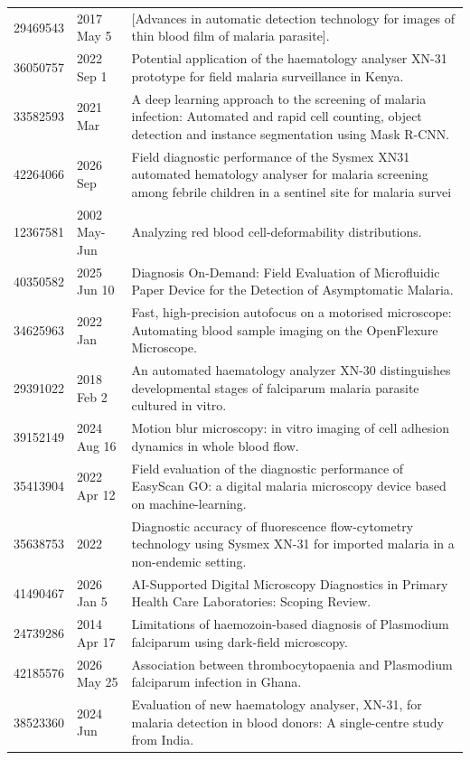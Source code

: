 \begin{longtable}{llp{9.5cm}}
29469543 & 2017 May 5 & [Advances in automatic detection technology for images of thin blood film of malaria parasite]. \\
36050757 & 2022 Sep 1 & Potential application of the haematology analyser XN-31 prototype for field malaria surveillance in Kenya. \\
33582593 & 2021 Mar & A deep learning approach to the screening of malaria infection: Automated and rapid cell counting, object detection and instance segmentation using Mask R-CNN. \\
42264066 & 2026 Sep & Field diagnostic performance of the Sysmex XN31 automated hematology analyser for malaria screening among febrile children in a sentinel site for malaria survei \\
12367581 & 2002 May-Jun & Analyzing red blood cell-deformability distributions. \\
40350582 & 2025 Jun 10 & Diagnosis On-Demand: Field Evaluation of Microfluidic Paper Device for the Detection of Asymptomatic Malaria. \\
34625963 & 2022 Jan & Fast, high-precision autofocus on a motorised microscope: Automating blood sample imaging on the OpenFlexure Microscope. \\
29391022 & 2018 Feb 2 & An automated haematology analyzer XN-30 distinguishes developmental stages of falciparum malaria parasite cultured in vitro. \\
39152149 & 2024 Aug 16 & Motion blur microscopy: in vitro imaging of cell adhesion dynamics in whole blood flow. \\
35413904 & 2022 Apr 12 & Field evaluation of the diagnostic performance of EasyScan GO: a digital malaria microscopy device based on machine-learning. \\
35638753 & 2022 & Diagnostic accuracy of fluorescence flow-cytometry technology using Sysmex XN-31 for imported malaria in a non-endemic setting. \\
41490467 & 2026 Jan 5 & AI-Supported Digital Microscopy Diagnostics in Primary Health Care Laboratories: Scoping Review. \\
24739286 & 2014 Apr 17 & Limitations of haemozoin-based diagnosis of Plasmodium falciparum using dark-field microscopy. \\
42185576 & 2026 May 25 & Association between thrombocytopaenia and Plasmodium falciparum infection in Ghana. \\
38523360 & 2024 Jun & Evaluation of new haematology analyser, XN-31, for malaria detection in blood donors: A single-centre study from India. \\

\end{longtable}
